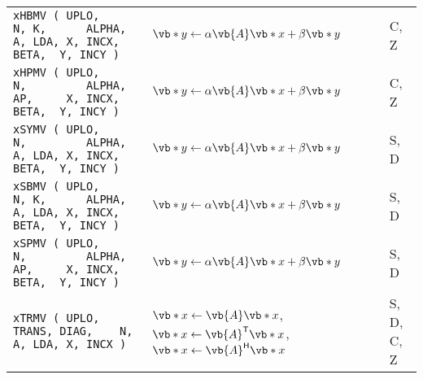 \documentclass[10pt,a3paper, landscape]{article}
\newcommand{\T}{\mathsf{T}}
\renewcommand{\H}{\mathsf{H}}
\begin{document}
\begin{tabular}{lll}
		\verb|xHBMV ( UPLO,                 N, K,      ALPHA, A, LDA, X, INCX, BETA,  Y, INCY )        |                                                                    & $\vb*{y} \gets \alpha \vb{A} \vb*{x} + \beta \vb*{y}$                                                                                                                                                                                                        & C, Z               \\
		\verb|xHPMV ( UPLO,                 N,         ALPHA, AP,     X, INCX, BETA,  Y, INCY )        |                                                                    & $\vb*{y} \gets \alpha \vb{A} \vb*{x} + \beta \vb*{y}$                                                                                                                                                                                                        & C, Z               \\
		\verb|xSYMV ( UPLO,                 N,         ALPHA, A, LDA, X, INCX, BETA,  Y, INCY )        |                                                                    & $\vb*{y} \gets \alpha \vb{A} \vb*{x} + \beta \vb*{y}$                                                                                                                                                                                                        & S, D               \\
		\verb|xSBMV ( UPLO,                 N, K,      ALPHA, A, LDA, X, INCX, BETA,  Y, INCY )        |                                                                    & $\vb*{y} \gets \alpha \vb{A} \vb*{x} + \beta \vb*{y}$                                                                                                                                                                                                        & S, D               \\
		\verb|xSPMV ( UPLO,                 N,         ALPHA, AP,     X, INCX, BETA,  Y, INCY )        |                                                                    & $\vb*{y} \gets \alpha \vb{A} \vb*{x} + \beta \vb*{y}$                                                                                                                                                                                                        & S, D               \\
		\verb|xTRMV ( UPLO, TRANS, DIAG,    N,                A, LDA, X, INCX )                        |                                                                    & $\vb*{x} \gets \vb{A} \vb*{x}$, $\vb*{x} \gets \vb{A}^{\T} \vb*{x}$, $\vb*{x} \gets \vb{A}^{\H} \vb*{x}$                                                                                                                                                     & S, D, C, Z         \\

\end{tabular}
\end{document}

